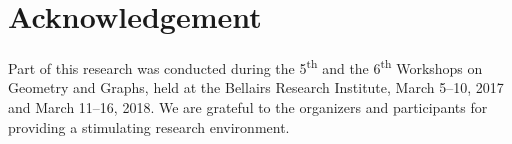 \documentclass{patmorin}
\begin{document}
\section*{Acknowledgement}

Part of this research was conducted during the 5\textsuperscript{th} and the 6\textsuperscript{th} Workshops on Geometry and Graphs, held at the Bellairs Research Institute, March 5--10, 2017 and March 11--16, 2018.  We are grateful to the organizers and participants for providing a stimulating research environment.
%

\newpage


\end{document}
